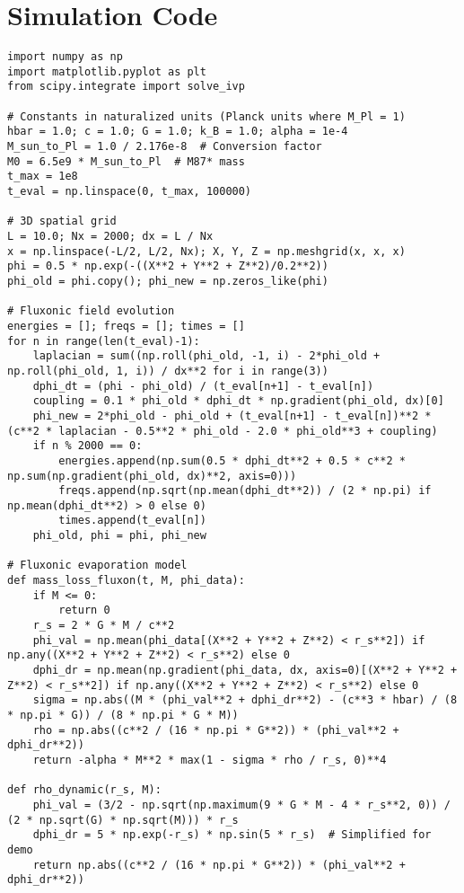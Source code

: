 \documentclass{article}
\begin{document}
\section{Simulation Code}
\begin{lstlisting}
import numpy as np
import matplotlib.pyplot as plt
from scipy.integrate import solve_ivp

# Constants in naturalized units (Planck units where M_Pl = 1)
hbar = 1.0; c = 1.0; G = 1.0; k_B = 1.0; alpha = 1e-4
M_sun_to_Pl = 1.0 / 2.176e-8  # Conversion factor
M0 = 6.5e9 * M_sun_to_Pl  # M87* mass
t_max = 1e8
t_eval = np.linspace(0, t_max, 100000)

# 3D spatial grid
L = 10.0; Nx = 2000; dx = L / Nx
x = np.linspace(-L/2, L/2, Nx); X, Y, Z = np.meshgrid(x, x, x)
phi = 0.5 * np.exp(-((X**2 + Y**2 + Z**2)/0.2**2))
phi_old = phi.copy(); phi_new = np.zeros_like(phi)

# Fluxonic field evolution
energies = []; freqs = []; times = []
for n in range(len(t_eval)-1):
    laplacian = sum((np.roll(phi_old, -1, i) - 2*phi_old + np.roll(phi_old, 1, i)) / dx**2 for i in range(3))
    dphi_dt = (phi - phi_old) / (t_eval[n+1] - t_eval[n])
    coupling = 0.1 * phi_old * dphi_dt * np.gradient(phi_old, dx)[0]
    phi_new = 2*phi_old - phi_old + (t_eval[n+1] - t_eval[n])**2 * (c**2 * laplacian - 0.5**2 * phi_old - 2.0 * phi_old**3 + coupling)
    if n % 2000 == 0:
        energies.append(np.sum(0.5 * dphi_dt**2 + 0.5 * c**2 * np.sum(np.gradient(phi_old, dx)**2, axis=0)))
        freqs.append(np.sqrt(np.mean(dphi_dt**2)) / (2 * np.pi) if np.mean(dphi_dt**2) > 0 else 0)
        times.append(t_eval[n])
    phi_old, phi = phi, phi_new

# Fluxonic evaporation model
def mass_loss_fluxon(t, M, phi_data):
    if M <= 0:
        return 0
    r_s = 2 * G * M / c**2
    phi_val = np.mean(phi_data[(X**2 + Y**2 + Z**2) < r_s**2]) if np.any((X**2 + Y**2 + Z**2) < r_s**2) else 0
    dphi_dr = np.mean(np.gradient(phi_data, dx, axis=0)[(X**2 + Y**2 + Z**2) < r_s**2]) if np.any((X**2 + Y**2 + Z**2) < r_s**2) else 0
    sigma = np.abs((M * (phi_val**2 + dphi_dr**2) - (c**3 * hbar) / (8 * np.pi * G)) / (8 * np.pi * G * M))
    rho = np.abs((c**2 / (16 * np.pi * G**2)) * (phi_val**2 + dphi_dr**2))
    return -alpha * M**2 * max(1 - sigma * rho / r_s, 0)**4

def rho_dynamic(r_s, M):
    phi_val = (3/2 - np.sqrt(np.maximum(9 * G * M - 4 * r_s**2, 0)) / (2 * np.sqrt(G) * np.sqrt(M))) * r_s
    dphi_dr = 5 * np.exp(-r_s) * np.sin(5 * r_s)  # Simplified for demo
    return np.abs((c**2 / (16 * np.pi * G**2)) * (phi_val**2 + dphi_dr**2))


\end{lstlisting}
\end{document}
